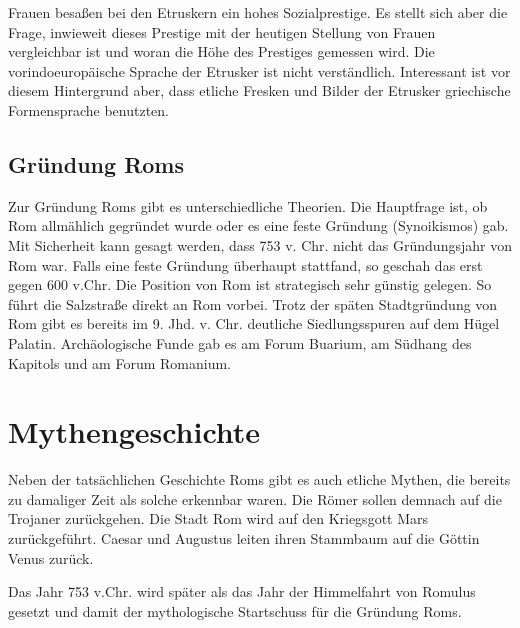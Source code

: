 \documentclass[10pt,a4paper,oneside,ngerman,numbers=noenddot]{scrartcl}
\begin{document}
Frauen besaßen bei den Etruskern ein hohes Sozialprestige. Es stellt sich aber die Frage, inwieweit dieses Prestige mit der heutigen Stellung
von Frauen vergleichbar ist und woran die Höhe des Prestiges gemessen wird. Die vorindoeuropäische Sprache der Etrusker ist nicht verständlich.
Interessant ist vor diesem Hintergrund aber, dass etliche Fresken und Bilder der Etrusker griechische Formensprache benutzten.

\subsection*{Gründung Roms}

Zur Gründung Roms gibt es unterschiedliche Theorien. Die Hauptfrage ist, ob Rom allmählich gegründet wurde oder es eine feste Gründung 
(Synoikismos) gab. Mit Sicherheit kann gesagt werden, dass 753 v. Chr. nicht das Gründungsjahr von Rom war. Falls eine feste Gründung
überhaupt stattfand, so geschah das erst gegen 600 v.Chr. Die Position von Rom ist strategisch sehr günstig gelegen. So führt die Salzstraße
direkt an Rom vorbei. Trotz der späten Stadtgründung von Rom gibt es bereits im 9. Jhd. v. Chr. deutliche Siedlungsspuren auf dem Hügel Palatin.
Archäologische Funde gab es am Forum Buarium, am Südhang des Kapitols und am Forum Romanium.

\section*{Mythengeschichte}

Neben der tatsächlichen Geschichte Roms gibt es auch etliche Mythen, die bereits zu damaliger Zeit als solche erkennbar waren. Die Römer sollen demnach
auf die Trojaner zurückgehen. Die Stadt Rom wird auf den Kriegsgott Mars zurückgeführt. Caesar und Augustus leiten ihren Stammbaum auf die 
Göttin Venus zurück.

Das Jahr 753 v.Chr. wird später als das Jahr der Himmelfahrt von Romulus gesetzt und damit der mythologische Startschuss für die Gründung Roms.
\end{document}

